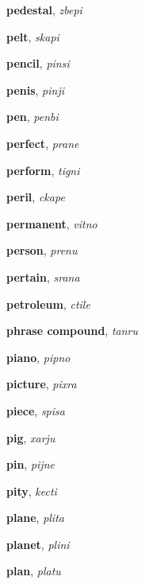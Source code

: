 \documentclass[12pt]{book}
\begin{document}
\begin{description}
\item[ ] \textbf{pedestal}, \textit{zbepi}

\item[ ] \textbf{pelt}, \textit{skapi}

\item[ ] \textbf{pencil}, \textit{pinsi}

\item[ ] \textbf{penis}, \textit{pinji}

\item[ ] \textbf{pen}, \textit{penbi}

\item[ ] \textbf{perfect}, \textit{prane}

\item[ ] \textbf{perform}, \textit{tigni}

\item[ ] \textbf{peril}, \textit{ckape}

\item[ ] \textbf{permanent}, \textit{vitno}

\item[ ] \textbf{person}, \textit{prenu}

\item[ ] \textbf{pertain}, \textit{srana}

\item[ ] \textbf{petroleum}, \textit{ctile}

\item[ ] \textbf{phrase compound}, \textit{tanru}

\item[ ] \textbf{piano}, \textit{pipno}

\item[ ] \textbf{picture}, \textit{pixra}

\item[ ] \textbf{piece}, \textit{spisa}

\item[ ] \textbf{pig}, \textit{xarju}

\item[ ] \textbf{pin}, \textit{pijne}

\item[ ] \textbf{pity}, \textit{kecti}

\item[ ] \textbf{plane}, \textit{plita}

\item[ ] \textbf{planet}, \textit{plini}

\item[ ] \textbf{plan}, \textit{platu}


\end{description}
\end{document}
